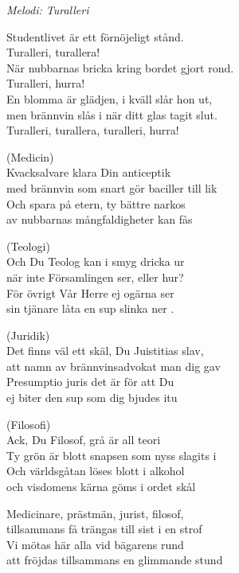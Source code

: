 {\footnotesize\textit{Melodi: Turalleri}}\par
\vspace{10pt}
Studentlivet är ett förnöjeligt stånd.\\
Turalleri, turallera!\\
När nubbarnas bricka kring bordet gjort rond.\\
Turalleri, hurra!\\
En blomma är glädjen, i kväll slår hon ut,\\
men brännvin slås i när ditt glas tagit slut.\\
Turalleri, turallera, turalleri, hurra!\par
\vspace{10pt}
(Medicin)\\
Kvacksalvare klara Din anticeptik \\
med brännvin som snart gör baciller till lik\\
Och spara på etern, ty bättre narkos\\
av nubbarnas mångfaldigheter kan fås \par
\vspace{10pt}
(Teologi)\\
Och Du Teolog kan i smyg dricka ur \\
när inte Församlingen ser, eller hur? \\
För övrigt Vår Herre ej ogärna ser\\
sin tjänare låta en sup slinka ner .\par
\vspace{10pt}
(Juridik)\\
Det finns väl ett skäl, Du Juistitias slav, \\
att namn av brännvinsadvokat man dig gav \\
Presumptio juris det är för att Du\\
ej biter den sup som dig bjudes itu \par
\newpage
(Filosofi)\\
Ack, Du Filosof, grå är all teori \\
Ty grön är blott snapsen som nyss slagits i \\
Och världsgåtan löses blott i alkohol\\
och visdomens kärna göms i ordet skål \par
\vspace{10pt}
Medicinare, prästmän, jurist, filosof, \\
tillsammans få trängas till sist i en strof \\
Vi mötas här alla vid bägarens rund\\
att fröjdas tillsammans en glimmande stund
